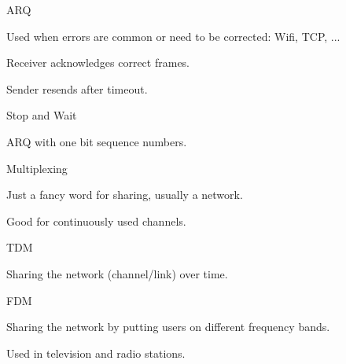 \documentclass[main.tex]{subfiles}
\begin{document}
\begin{card}{ARQ}
\item Used when errors are common or need to be corrected: Wifi, TCP, ...
\item Receiver acknowledges correct frames.
\item Sender resends after timeout.
\end{card}

\full{}
\begin{card}{Stop and Wait}
\item ARQ with one bit sequence numbers.
\end{card}

\begin{card}{Multiplexing}
\item Just a fancy word for sharing, usually a network.
\item Good for continuously used channels.
\end{card}

\begin{card}{TDM}
\item Sharing the network (channel/link) over time.
\end{card}

\begin{card}{FDM}
\item Sharing the network by putting users on different frequency bands.
\item Used in television and radio stations.
\end{card}

\end{document}
